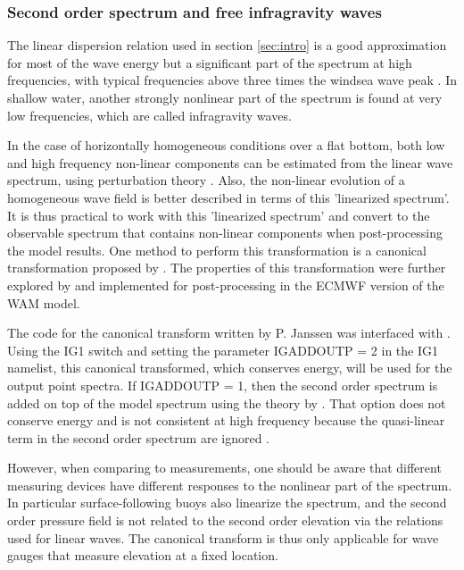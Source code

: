 \vsssub
\subsubsection{Second order spectrum and free infragravity waves} \label{sec:IG1}
\vsssub


\noindent 
The linear dispersion relation used in section \ref{sec:intro} is a good
approximation for most of the wave energy but a significant part of the
spectrum at high frequencies, with typical frequencies above three times the
windsea wave peak \citep[e.g.][]{rep:Lec13}.  In shallow water, another
strongly nonlinear part of the spectrum is found at very low frequencies,
which are called infragravity waves.

In the case of horizontally homogeneous conditions over a flat bottom, both
low and high frequency non-linear components can be estimated from the linear
wave spectrum, using perturbation theory \citep[e.g.][]{art:Has62}. Also, the
non-linear evolution of a homogeneous wave field is better described in terms
of this 'linearized spectrum'. It is thus practical to work with this
'linearized spectrum' and convert to the observable spectrum that contains
non-linear components when post-processing the model results. One method to
perform this transformation is a canonical transformation proposed by
\cite{art:Kra94}. The properties of this transformation were further explored
by \cite{art:Jan09} and implemented for post-processing in the ECMWF version
of the WAM model.

The code for the canonical transform written by P. Janssen was interfaced with
\ws.  Using the {\code IG1} switch and setting the parameter {\code IGADDOUTP
= 2} in the {\code IG1} namelist, this canonical transformed, which conserves
energy, will be used for the output point spectra.  If {\code IGADDOUTP = 1},
then the second order spectrum is added on top of the model spectrum using the
theory by \citep[e.g.][]{art:Has62}. That option does not conserve energy and
is not consistent at high frequency because the quasi-linear term in the
second order spectrum are ignored \citep{art:Jan09}.

However, when comparing to measurements, one should be aware that different
measuring devices have different responses to the nonlinear part of the
spectrum. In particular surface-following buoys also linearize the spectrum,
and the second order pressure field is not related to the second order
elevation via the relations used for linear waves. The canonical transform is
thus only applicable for wave gauges that measure elevation at a fixed
location.

